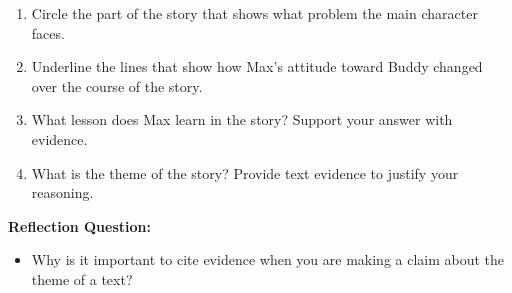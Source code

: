 \documentclass[12pt]{article}
\begin{document}
\begin{tcolorbox}[colframe=black!60, colback=white, 
coltitle=black, colbacktitle=black!15, fonttitle=\bfseries\Large, 
title=Independent Practice, halign title=center, left=10pt, right=10pt, top=10pt, bottom=15pt]

\begin{enumerate}[itemsep=1em]
    \item Circle the part of the story that shows what problem the main character faces.
    \item Underline the lines that show how Max's attitude toward Buddy changed over the course of the story.
    \item What lesson does Max learn in the story? Support your answer with evidence.
    \vspace{3cm}
    \item What is the theme of the story? Provide text evidence to justify your reasoning.
      \vspace{3cm}
\end{enumerate}
\end{tcolorbox}
  \vspace{1em}
\begin{tcolorbox}[colframe=black!60, colback=white, 
coltitle=black, colbacktitle=black!15, fonttitle=\bfseries\Large, 
title=Exit Ticket, halign title=center, left=10pt, right=10pt, top=10pt, bottom=15pt]
\textbf{Reflection Question:}
\begin{itemize}
    \item Why is it important to cite evidence when you are making a claim about the theme of a text?
      \vspace{5cm}
\end{itemize}
\end{tcolorbox}
\end{document}
